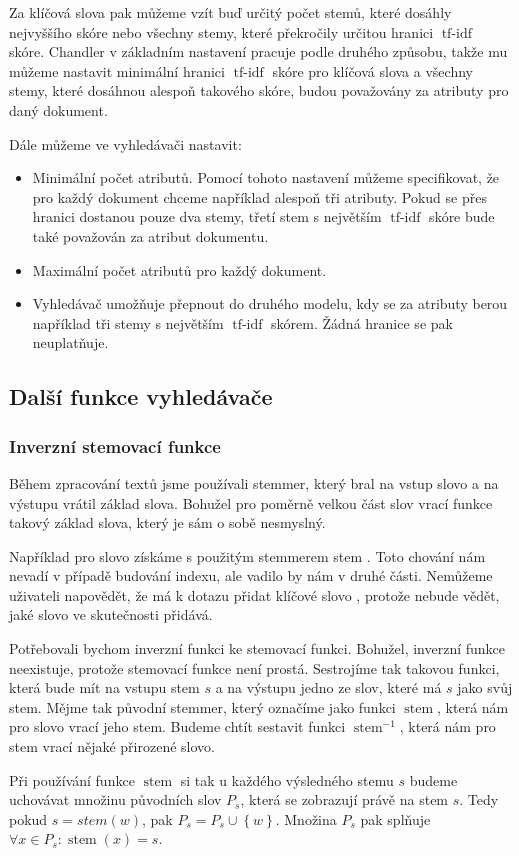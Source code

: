 \documentclass[12pt]{article}
\newcommand{\name}{Chandler}
\newcommand{\ssection}[1]{\subsection{#1}}
\newcommand{\sssection}[1]{\subsubsection{#1}}
\newcommand{\adds}[1]{\left\{#1\right\}}
\DeclareMathOperator{\tfidf}{tf-idf}
\DeclareMathOperator{\stem}{stem}
\newcommand{\invstem}{\stem^{-1}}
\begin{document}
Za klíčová slova pak můžeme vzít buď určitý počet stemů, které dosáhly nejvyššího skóre nebo všechny stemy, které překročily určitou hranici $\tfidf$ skóre. \name{} v základním nastavení pracuje podle druhého způsobu, takže mu můžeme nastavit minimální hranici $\tfidf$ skóre pro klíčová slova a všechny stemy, které dosáhnou alespoň takového skóre, budou považovány za atributy pro daný dokument. 

Dále můžeme ve vyhledávači nastavit:

\begin{itemize}
	\item Minimální počet atributů. Pomocí tohoto nastavení můžeme specifikovat, že pro každý dokument chceme například alespoň tři atributy. Pokud se přes hranici dostanou pouze dva stemy, třetí stem s největším $\tfidf$ skóre bude také považován za atribut dokumentu. 
	\item Maximální počet atributů pro každý dokument. 
	\item Vyhledávač umožňuje přepnout do druhého modelu, kdy se za atributy berou například tři stemy s největším $\tfidf$ skórem. Žádná hranice se pak neuplatňuje. 
\end{itemize}

\ssection{Další funkce vyhledávače}
\sssection{Inverzní stemovací funkce}

Během zpracování textů jsme používali stemmer, který bral na vstup slovo a na výstupu vrátil základ slova. Bohužel pro poměrně velkou část slov vrací funkce takový základ slova, který je sám o sobě nesmyslný. 

Například pro slovo  získáme s použitým stemmerem stem . Toto chování nám nevadí v případě budování indexu, ale vadilo by nám v druhé části. Nemůžeme uživateli napovědět, že má k dotazu přidat klíčové slovo , protože nebude vědět, jaké slovo ve skutečnosti přidává. 

Potřebovali bychom inverzní funkci ke stemovací funkci. Bohužel, inverzní funkce neexistuje, protože stemovací funkce není prostá. Sestrojíme tak takovou funkci, která bude mít na vstupu stem $s$ a na výstupu jedno ze slov, které má $s$ jako svůj stem. Mějme tak původní stemmer, který označíme jako funkci $\stem$, která nám pro slovo vrací jeho stem. Budeme chtít sestavit funkci $\invstem$, která nám pro stem vrací nějaké přirozené slovo.

Při používání funkce $\stem$ si tak u každého výsledného stemu $s$ budeme uchovávat množinu původních slov $P_s$, která se zobrazují právě na stem $s$. Tedy pokud $s=stem(w)$, pak $P_s=P_s\cup\adds{w}$. Množina $P_s$ pak splňuje $\forall x\in P_s: \stem(x)=s$. 
\end{document}
